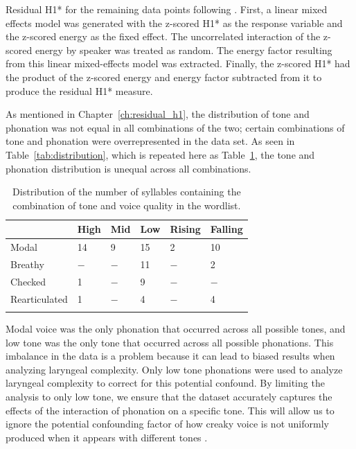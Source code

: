Residual H1* for the remaining data points following \citet{chaiH1H2AcousticMeasure2022}. First, a linear mixed effects model was generated with the z-scored H1* as the response variable and the z-scored energy as the fixed effect. The uncorrelated interaction of the z-scored energy by speaker was treated as random. The energy factor resulting from this linear mixed-effects model was extracted. Finally, the z-scored H1* had the product of the z-scored energy and energy factor subtracted from it to produce the residual H1* measure.

As mentioned in Chapter~\ref{ch:residual_h1}, the distribution of tone and phonation was not equal in all combinations of the two; certain combinations of tone and phonation were overrepresented in the data set. As seen in Table~\ref{tab:distribution}, which is repeated here as Table~\ref{tab:distribution_repeat}, the tone and phonation distribution is unequal across all combinations. 

\begin{table}[!h]
    \centering
    \caption{Distribution of the number of syllables containing the combination of tone and voice quality in the wordlist.}
    \label{tab:distribution_repeat}
      \begin{tabular}{llllll}
      \lsptoprule
      & High & Mid & Low & Rising & Falling\\
      \hline
      Modal & 14 & 9 & 15 & 2 & 10 \\
      Breathy & $-$ & $-$ & 11 & $-$ & 2 \\
      Checked & 1 & $-$ & 9 & $-$ & $-$ \\
      Rearticulated & 1 & $-$ & 4 & $-$ & 4 \\
      \lspbottomrule
      \end{tabular}
\end{table}

Modal voice was the only phonation that occurred across all possible tones, and low tone was the only tone that occurred across all possible phonations. This imbalance in the data is a problem because it can lead to biased results when analyzing laryngeal complexity. Only low tone phonations were used to analyze laryngeal complexity to correct for this potential confound. By limiting the analysis to only low tone, we ensure that the dataset accurately captures the effects of the interaction of phonation on a specific tone. This will allow us to ignore the potential confounding factor of how creaky voice is not uniformly produced when it appears with different tones \citep{keatingAcousticPropertiesDifferent2015}.

